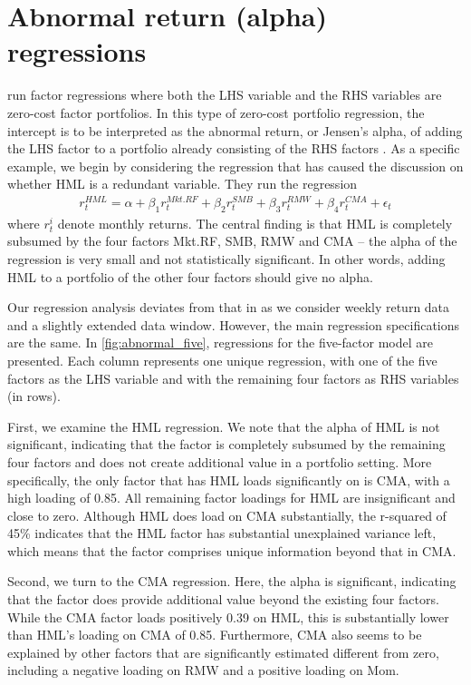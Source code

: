 
\section{Abnormal return (alpha) regressions}
\label{sec:alpha_reg}
\textcite{FF2015} run factor regressions where both the LHS variable and the RHS variables are zero-cost factor portfolios. In this type of zero-cost portfolio regression, the intercept is to be interpreted as the abnormal return, or Jensen's alpha, of adding the LHS factor to a portfolio already consisting of the RHS factors \autocite{Jensen1968}. As a specific example, we begin by considering the regression that has caused the discussion on whether HML is a redundant variable. They run the regression
\begin{align}
  r^{HML}_t = \alpha + \beta_1 r^{Mkt.RF}_t + \beta_2 r^{SMB}_t + \beta_3 r^{RMW}_t + \beta_4 r^{CMA}_t + \epsilon_t
\end{align}
where $r^i_t$ denote monthly returns. The central finding is that HML is completely subsumed by the four factors Mkt.RF, SMB, RMW and CMA -- the alpha of the regression is very small and not statistically significant. In other words, adding HML to a portfolio of the other four factors should give no alpha.

Our regression analysis deviates from that in \textcite{FF2015} as we consider weekly return data and a slightly extended data window. However, the main regression specifications are the same. In \autoref{fig:abnormal_five}, regressions for the five-factor model are presented. Each column represents one unique regression, with one of the five factors as the LHS variable and with the remaining four factors as RHS variables (in rows). 

First, we examine the HML regression. We note that the alpha of HML is not significant, indicating that the factor is completely subsumed by the remaining four factors and does not create additional value in a portfolio setting. More specifically, the only factor that has HML loads significantly on is CMA, with a high loading of 0.85. All remaining factor loadings for HML are insignificant and close to zero. Although HML does load on CMA substantially, the r-squared of 45\% indicates that the HML factor has substantial unexplained variance left, which means that the factor comprises unique information beyond that in CMA. 

Second, we turn to the CMA regression. Here, the alpha is significant, indicating that the factor does provide additional value beyond the existing four factors. While the CMA factor loads positively 0.39 on HML, this is substantially lower than HML's loading on CMA of 0.85. Furthermore, CMA also seems to be explained by other factors that are significantly estimated different from zero, including a negative loading on RMW and a positive loading on Mom.

